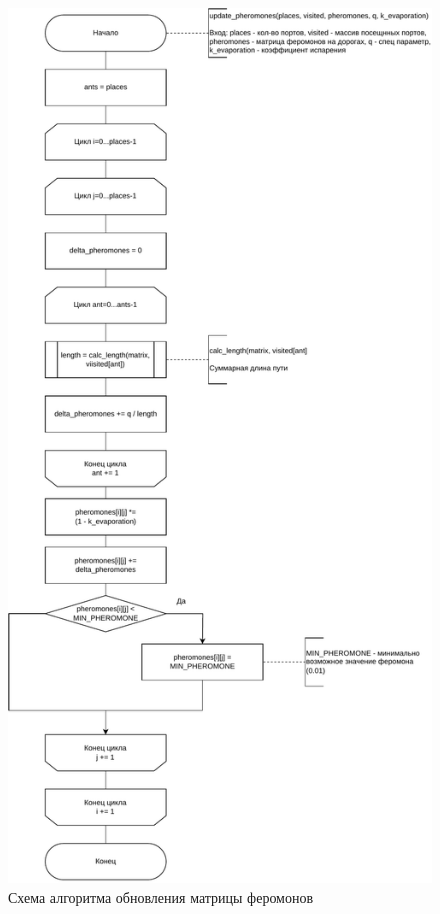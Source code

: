\begin{figure}[h]
	\centering
	\includegraphics[height=0.9\textheight]{img/update.pdf}
	\caption{Схема алгоритма обновления матрицы феромонов}
	\label{fig:update}
\end{figure}


